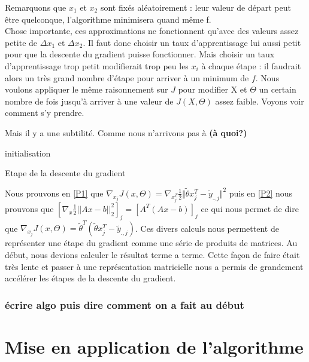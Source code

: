 \documentclass[a4paper,10pt]{article}
\begin{document}
Remarquons que $x_1$ et $x_2$ sont fixés aléatoirement : leur valeur de départ peut être quelconque, l'algorithme minimisera quand même f.\\
Chose importante, ces approximations ne fonctionnent qu'avec des valeurs assez petite de $\Delta x_1$ et $\Delta x_2$. Il faut donc choisir un taux d'apprentissage lui aussi petit pour que la descente du gradient puisse fonctionner. Mais choisir un taux d'apprentissage trop petit modifierait trop peu les $x_i$ à chaque étape : il faudrait alors un très grand nombre d'étape pour arriver à un minimum de $f$.
Nous voulons appliquer le même raisonnement sur $J$ pour modifier X et $\Theta$ un certain nombre de fois jusqu'à arriver à une valeur de $J(X, \Theta)$ assez faible. Voyons voir comment s'y prendre.

Mais il y a une subtilité. Comme nous n'arrivons pas à \textbf{(à quoi?)}

\begin{algorithm}[H]
 initialisation\;
 
 \caption{Etape de la descente du gradient}
\end{algorithm}
Nous prouvons en \ref{P1} que $ \nabla_{x_{j}}J(x, \Theta) = \nabla_{x_{j}^T}\frac{1}{2}\Vert\tilde{\theta}x_{j}^{T}-\tilde{y}_{.,j}\Vert^{2}$
puis en \ref{P2} nous prouvons que $[\nabla_{x} \frac{1}{2}||Ax - b||^{2}_{2}]_{j} = [A^{T}(Ax - b)]_{j}$ ce qui nous permet de dire
que $ \nabla_{x_{j}}J(x, \Theta) =  \tilde{\theta}^{T}(\tilde{\theta}x_{j}^{T}-\tilde{y}_{.,j})$. Ces divers calculs nous permettent
de représenter une étape du gradient comme une série de produits de matrices. Au début, nous devions calculer le résultat terme a terme. Cette
façon de faire était très lente et passer à une représentation matricielle nous a permis de grandement accélérer les étapes de la descente du gradient.
\subsubsection{écrire algo puis dire comment on a fait au début}
\section{Mise en application de l'algorithme}
\end{document}
